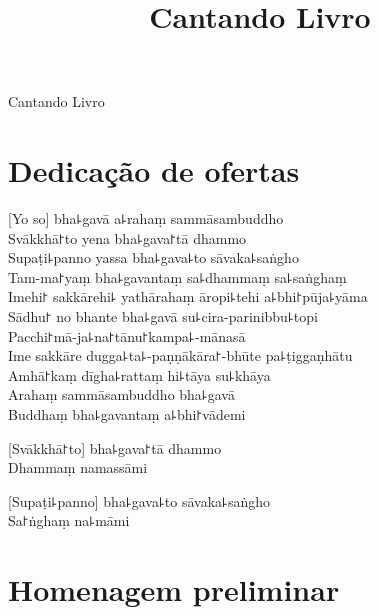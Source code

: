 \documentclass[
  babelLanguage=portuguese,
  final,
]{chantingbook}
\title{Cantando Livro}
\subtitle{}
\begin{document}
\frontmatter

\thispagestyle{empty}

{\centering
\mbox{}
\vfill

\parttitlefont\color{chaptertitle}

Cantando Livro

\vspace*{4\baselineskip}

\vfill

\mbox{}
}

\mainmatter

\usePsMarksPartOnly

\artopttrue

\chapter{Dedicação de ofertas}

[Yo so] bha꜕gavā a꜕rahaṃ sammāsambuddho\\
Svākkhā꜓to yena bha꜕gava꜓tā dhammo\\
Supaṭi꜕panno yassa bha꜕gava꜕to sāvaka꜕saṅgho\\
Tam-ma꜓yaṃ bha꜕gavantaṃ sa꜕dhammaṃ sa꜕saṅghaṃ\\
Imehi꜓ sakkārehi꜕ yathārahaṃ āropi꜕tehi a꜕bhi꜓pūja꜕yāma\\
Sādhu꜓ no bhante bha꜕gavā su꜕cira-parinibbu꜕topi\\
Pacchi꜓mā-ja꜕na꜓tānu꜓kampa꜕-mānasā\\
Ime sakkāre dugga꜕ta꜕-paṇṇākāra꜓-bhūte pa꜕ṭiggaṇhātu\\
Amhā꜓kaṃ dīgha꜕rattaṃ hi꜕tāya su꜕khāya\\
Arahaṃ sammāsambuddho bha꜕gavā\\
Buddhaṃ bha꜕gavantaṃ a꜕bhi꜓vādemi

[Svākkhā꜓to] bha꜕gava꜓tā dhammo\\
Dhammaṃ namassāmi

[Supaṭi꜕panno] bha꜕gava꜕to sāvaka꜕saṅgho\\
Sa꜓ṅghaṃ na꜕māmi

\chapter{Homenagem preliminar}

\begin{leader}
\end{leader}
\end{document}
